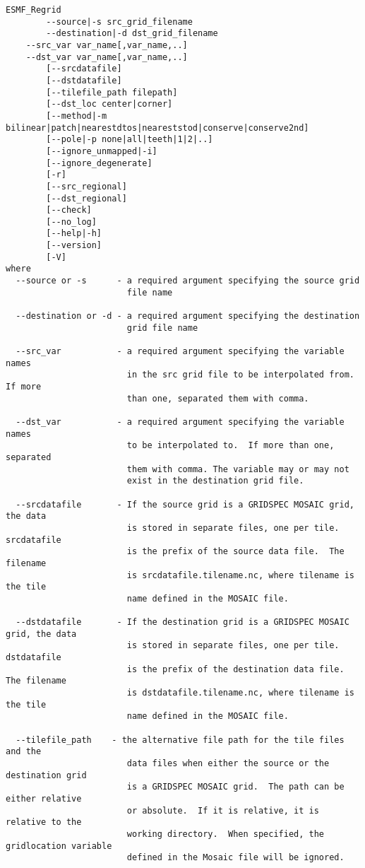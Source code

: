 \begin{verbatim}
ESMF_Regrid  
        --source|-s src_grid_filename
        --destination|-d dst_grid_filename
	--src_var var_name[,var_name,..]
	--dst_var var_name[,var_name,..]
        [--srcdatafile]
        [--dstdatafile]
        [--tilefile_path filepath]
        [--dst_loc center|corner]
        [--method|-m bilinear|patch|nearestdtos|neareststod|conserve|conserve2nd]
        [--pole|-p none|all|teeth|1|2|..]
        [--ignore_unmapped|-i]
        [--ignore_degenerate]
        [-r]
        [--src_regional]
        [--dst_regional]
        [--check]
        [--no_log]
        [--help|-h]
        [--version]
        [-V]
where
  --source or -s      - a required argument specifying the source grid
                        file name

  --destination or -d - a required argument specifying the destination
                        grid file name

  --src_var           - a required argument specifying the variable names 
                        in the src grid file to be interpolated from.  If more
                        than one, separated them with comma.

  --dst_var           - a required argument specifying the variable names 
                        to be interpolated to.  If more than one, separated 
                        them with comma. The variable may or may not 
                        exist in the destination grid file.

  --srcdatafile       - If the source grid is a GRIDSPEC MOSAIC grid, the data 
                        is stored in separate files, one per tile. srcdatafile
                        is the prefix of the source data file.  The filename
                        is srcdatafile.tilename.nc, where tilename is the tile 
                        name defined in the MOSAIC file.

  --dstdatafile       - If the destination grid is a GRIDSPEC MOSAIC grid, the data 
                        is stored in separate files, one per tile. dstdatafile
                        is the prefix of the destination data file.  The filename
                        is dstdatafile.tilename.nc, where tilename is the tile 
                        name defined in the MOSAIC file.

  --tilefile_path    - the alternative file path for the tile files and the
                        data files when either the source or the destination grid
                        is a GRIDSPEC MOSAIC grid.  The path can be either relative
                        or absolute.  If it is relative, it is relative to the
                        working directory.  When specified, the gridlocation variable
                        defined in the Mosaic file will be ignored. 


\end{verbatim}

